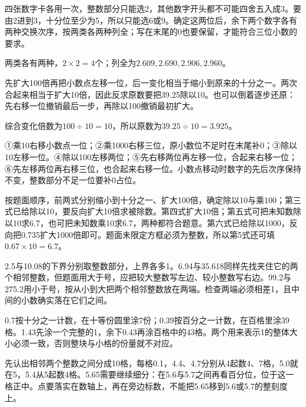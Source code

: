 \documentclass[multi=snippet,border=0pt]{standalone}
\newenvironment{snippet}[3]{\begin{minipage}{#1bp}\color{answerred}\fontsize{#2}{#3}\selectfont\raggedright}{\end{minipage}}
\begin{document}
\begin{snippet}{505}{11.5}{14}四张数字卡各用一次，整数部分只能选2，其他数字开头都不可能四舍五入成3。要由2进到3，十分位至少为5，所以只能选6或9。确定这两位后，余下两个数字各有两种交换次序，按两类各两种列全；写在末尾的0也要保留，才能符合三位小数的要求。\par 两类各有两种，\(2\times2=4\)个；列全为\(2.609,2.690,2.906,2.960\)。\end{snippet}
\begin{snippet}{505}{11.5}{14}先扩大100倍再把小数点左移一位，后一变化相当于缩小到原来的十分之一。两次合起来相当于扩大10倍，因此反求原数要把39.25除以10。也可以倒着逐步还原：先右移一位撤销最后一步，再除以100撤销最初扩大。\par 综合变化倍数为\(100\div10=10\)，所以原数为\(39.25\div10=3.925\)。\end{snippet}
\begin{snippet}{505}{11.5}{14}①乘10右移小数点一位；②乘1000右移三位，原小数位不足时在末尾补0；③除以10左移一位。④除以100左移两位；⑤先右移两位再左移一位，合起来右移一位；⑥先左移两位再右移三位，也合起来右移一位。小数点移动时数字的先后次序保持不变，整数部分不足一位要补0占位。\end{snippet}
\begin{snippet}{505}{11.5}{14}按题面顺序，前两式分别缩小到十分之一、扩大100倍，确定除以10与乘100；第三式已给除以10，要反向扩大10倍求被除数。第四式扩大10倍；第五式可把未知数除以10求6.7，也可把未知数乘10求6.7，两种都符合题意。第六式已给除以1000，反向把0.735扩大1000倍即可。题面未限定方框必须为整数，所以第5式还可填\(0.67\times10=6.7\)。\end{snippet}
\begin{snippet}{505}{11.5}{14}2.5与10.08的下界分别取整数部分，上界各多1。6.94与35.618同样先找夹住它的两个相邻整数，但题面用大于号，应把较大整数写左边、较小整数写右边。99.2与275.2用小于号，按从小到大把两个相邻整数放在两端。检查两端必须相差1，且中间的小数确实落在它们之间。\end{snippet}
\begin{snippet}{505}{11.5}{14}0.7按十分之一计数，在十等份圆里涂7份；0.39按百分之一计数，在百格里涂39格。1.43先涂一个完整的1，余下0.43再涂百格中的43格。两个用来表示1的整体大小必须一致，否则整块与小格的份量就不对应。\end{snippet}
\begin{snippet}{505}{11.5}{14}先认出相邻两个整数之间分成10格，每格0.1，4.4、4.7分别从4起数4、7格，5.0就在5，5.4从5起数4格。5.65需要继续细分：在5.6与5.7之间再看百分位，位于这一格正中。点要落实在数轴上，再在旁边标数，不能把5.65移到5.6或5.7的整刻度上。\end{snippet}
\end{document}
